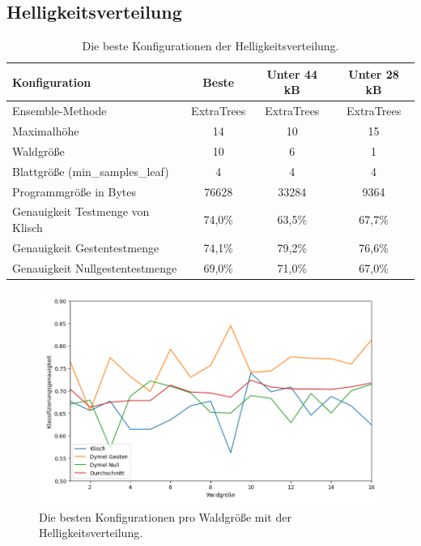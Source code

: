 \subsection{Helligkeitsverteilung}
\begin{table}[h!]
    \centering
    \begin{tabular}{ | l | c | c | c |}
        \hline
        Konfiguration & Beste & Unter 44 kB & Unter 28 kB \\\hline
        Ensemble-Methode & ExtraTrees & ExtraTrees & ExtraTrees \\\hline
        Maximalhöhe & 14 & 10 & 15 \\\hline
        Waldgröße & 10 & 6 & 1 \\\hline
        Blattgröße (min\_samples\_leaf) & 4 & 4 & 4 \\\hline
        Programmgröße in Bytes & 76628 & 33284 & 9364 \\\hline
        Genauigkeit Testmenge von Klisch & 74,0\% & 63,5\% & 67,7\% \\\hline
        Genauigkeit Gestentestmenge & 74,1\% & 79,2\% & 76,6\% \\\hline
        Genauigkeit Nullgestentestmenge & 69,0\% & 71,0\% & 67,0\% \\\hline
    \end{tabular}
    \caption{Die beste Konfigurationen der Helligkeitsverteilung.}
    \label{tab:helligkeitsverteilung}
\end{table}
\begin{figure}[h!]
    \centering
    \includegraphics[width=\linewidth]{images/helligkeitsverteilung_acc_per_size.png}
    \caption{Die besten Konfigurationen pro Waldgröße mit der Helligkeitsverteilung.}
    \label{fig:helligkeitsverteilung_per_forest_size}
\end{figure}
